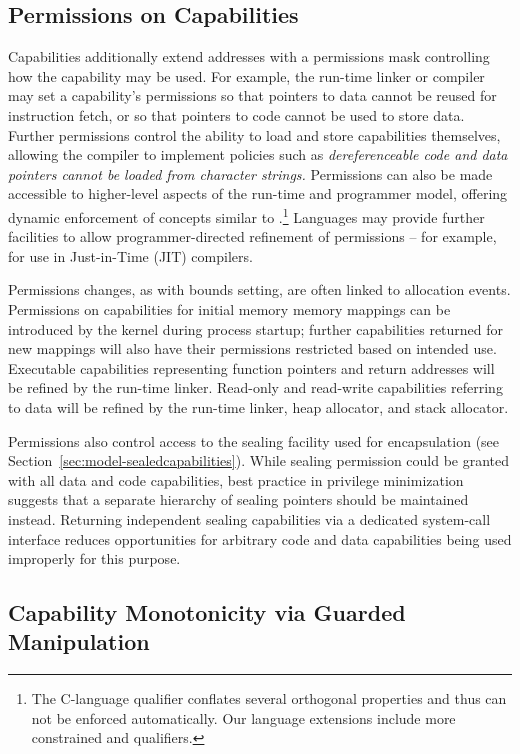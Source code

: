 \subsection{Permissions on Capabilities}
\label{sec:model-permissions}
Capabilities additionally extend addresses with a permissions mask controlling how the
capability may be used.
For example, the run-time linker or compiler may set a capability's
permissions so that pointers to data cannot be reused for instruction fetch,
or so that pointers to code cannot be used to store data.
Further permissions control the ability to load and store capabilities
themselves, allowing the compiler to implement policies such as
\textit{dereferenceable code and data pointers cannot be loaded from character
strings.}
Permissions can also be made accessible to higher-level aspects of the
run-time and programmer model, offering dynamic enforcement of concepts
similar to .\footnote{The C-language  qualifier
conflates several orthogonal properties and thus can not be enforced
automatically.
Our language extensions include more constrained  and
 qualifiers.}
Languages may provide further facilities to allow programmer-directed
refinement of permissions -- for example, for use in Just-in-Time (JIT)
compilers.

Permissions changes, as with bounds setting, are often linked to allocation
events.
Permissions on capabilities for initial memory memory mappings can be
introduced by the kernel during process startup; further capabilities returned
for new mappings will also have their permissions restricted based on intended
use.
Executable capabilities representing function pointers and return addresses
will be refined by the run-time linker.
Read-only and read-write capabilities referring to data will be refined by the
run-time linker, heap allocator, and stack allocator.

Permissions also control access to the sealing facility used for encapsulation
(see Section~\ref{sec:model-sealedcapabilities}).
While sealing permission could be granted with all data and code capabilities,
best practice in privilege minimization suggests that a separate hierarchy
of sealing pointers should be maintained instead.
Returning independent sealing capabilities via a dedicated system-call
interface reduces opportunities for arbitrary code and data capabilities being
used improperly for this purpose.

\subsection{Capability Monotonicity via Guarded Manipulation}
\label{sec:model-monotonicity}

